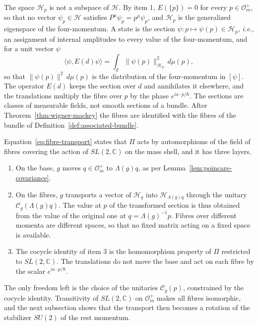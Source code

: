 \begin{remark}\label{rem:fibres}
	The space $\mathcal{H}_p$ is not a subspace of $\mathcal{H}$. By item 1, $E(\{p\})=0$ for every $p\in\mathcal{O}_m^+$, so that no vector $\psi_p\in\mathcal{H}$ satisfies $P^\mu\psi_p=p^\mu\psi_p$, and $\mathcal{H}_p$ is the generalized eigenspace of the four-momentum. A state is the section $\psi:p\mapsto\psi(p)\in\mathcal{H}_p$, \textit{i.e.}, an assignment of internal amplitudes to every value of the four-momentum, and for a unit vector $\psi$
	\begin{equation*}
		\langle\psi,E(d)\psi\rangle=\int_d\|\psi(p)\|^2_{\mathcal{H}_p}\,d\mu(p),
	\end{equation*}
	so that $\|\psi(p)\|^2\,d\mu(p)$ is the distribution of the four-momentum in $[\psi]$. The operator $E(d)$ keeps the section over $d$ and annihilates it elsewhere, and the translations multiply the fibre over $p$ by the phase $e^{ia\cdot p/\hbar}$. The sections are classes of measurable fields, not smooth sections of a bundle. After Theorem~\ref{thm:wigner-mackey} the fibres are identified with the fibres of the bundle of Definition~\ref{def:associated-bundle}.
\end{remark}

\begin{remark}\label{rem:fibre-action}
	Equation~\eqref{eq:fibre-transport} states that $\Pi$ acts by automorphisms of the field of fibres covering the action of $SL(2,\mathbb{C})$ on the mass shell, and it has three layers.
	\begin{enumerate}
		\item On the base, $g$ moves $q\in\mathcal{O}_m^+$ to $\Lambda(g)q$, as per Lemma~\ref{lem:poincare-covariance}.
		\item On the fibres, $g$ transports a vector of $\mathcal{H}_q$ into $\mathcal{H}_{\Lambda(g)q}$ through the unitary $\mathcal{C}_g(\Lambda(g)q)$. The value at $p$ of the transformed section is thus obtained from the value of the original one at $q=\Lambda(g)^{-1}p$. Fibres over different momenta are different spaces, so that no fixed matrix acting on a fixed space is available.
		\item The cocycle identity of item 3 is the homomorphism property of $\Pi$ restricted to $SL(2,\mathbb{C})$. The translations do not move the base and act on each fibre by the scalar $e^{ia\cdot p/\hbar}$.
	\end{enumerate}
	The only freedom left is the choice of the unitaries $\mathcal{C}_g(p)$, constrained by the cocycle identity. Transitivity of $SL(2,\mathbb{C})$ on $\mathcal{O}_m^+$ makes all fibres isomorphic, and the next subsection shows that the transport then becomes a rotation of the stabilizer $SU(2)$ of the rest momentum.
\end{remark}

